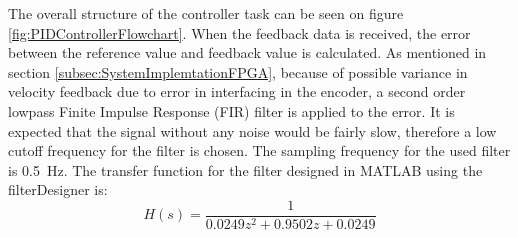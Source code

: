\documentclass[../../main.tex]{subfiles}
\begin{document}


The overall structure of the controller task can be seen on figure \ref{fig:PIDControllerFlowchart}. When the feedback data is received, the error between the reference value and feedback value is calculated. As mentioned in section \ref{subsec:SystemImplemtationFPGA}, because of possible variance in velocity feedback due to error in interfacing in the encoder, a second order lowpass Finite Impulse Response (FIR) filter is applied to the error. It is expected that the signal without any noise would be fairly slow, therefore a low cutoff frequency for the filter is chosen. The sampling frequency for the used filter is \SI{0.5}{\hertz}.
The transfer function for the filter designed in MATLAB using the filterDesigner is:
\begin{equation}
    H(s) = \frac{1}{0.0249z^2 + 0.9502z + 0.0249}
\end{equation}
\end{document}
